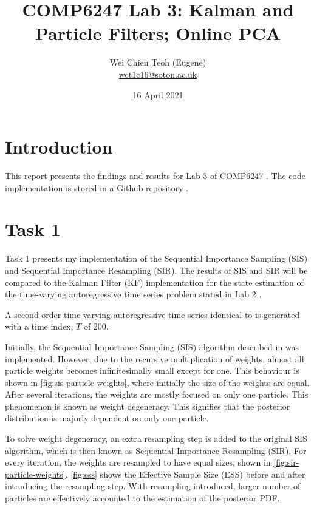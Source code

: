 \documentclass{article}
\title{COMP6247 Lab 3: Kalman and Particle Filters; Online PCA}
\author{Wei Chien Teoh (Eugene)\\\bigskip \href{mailto:wct1c16@soton.ac.uk}{wct1c16@soton.ac.uk}}
\date{16 April 2021}
\begin{document}
\maketitle

\section{Introduction}

This report presents the findings and results for Lab 3 of COMP6247 \cite{lab3}. The code implementation is stored in a Github repository \cite{github}.

\section{Task 1}

Task 1 presents my implementation of the Sequential Importance Sampling (SIS) and Sequential Importance Resampling (SIR). The results of SIS and SIR will be compared to the Kalman Filter (KF) implementation \cite{lab2ans} for the state estimation of the time-varying autoregressive time series problem stated in Lab 2 \cite{lab2}.

A second-order time-varying autoregressive time series identical to \cite{lab2} is generated with a time index, $T$ of 200.

Initially, the Sequential Importance Sampling (SIS) algorithm described in \cite{particle_filters} was implemented. However, due to the recursive multiplication of weights, almost all particle weights becomes infinitesimally small except for one. This behaviour is shown in \cref{fig:sis-particle-weights}, where initially the size of the weights are equal. After several iterations, the weights are mostly focused on only one particle. This phenomenon is known as weight degeneracy. This signifies that the posterior distribution is majorly dependent on only one particle.

To solve weight degeneracy, an extra resampling step \cite{particle_filters} is added to the original SIS algorithm, which is then known as Sequential Importance Resampling (SIR). For every iteration, the weights are resampled to have equal sizes, shown in \cref{fig:sir-particle-weights}. \cref{fig:ess} shows the Effective Sample Size (ESS) before and after introducing the resampling step. With resampling introduced, larger number of particles are effectively accounted to the estimation of the posterior PDF.

\end{document}
